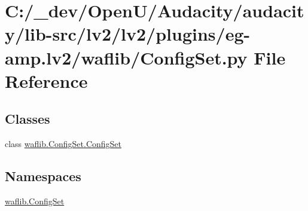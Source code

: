 \hypertarget{lv2_2plugins_2eg-amp_8lv2_2waflib_2_config_set_8py}{}\section{C\+:/\+\_\+dev/\+Open\+U/\+Audacity/audacity/lib-\/src/lv2/lv2/plugins/eg-\/amp.lv2/waflib/\+Config\+Set.py File Reference}
\label{lv2_2plugins_2eg-amp_8lv2_2waflib_2_config_set_8py}
\subsection*{Classes}
\begin{DoxyCompactItemize}
\item 
class \hyperlink{classwaflib_1_1_config_set_1_1_config_set}{waflib.\+Config\+Set.\+Config\+Set}
\end{DoxyCompactItemize}
\subsection*{Namespaces}
\begin{DoxyCompactItemize}
\item 
 \hyperlink{namespacewaflib_1_1_config_set}{waflib.\+Config\+Set}
\end{DoxyCompactItemize}
